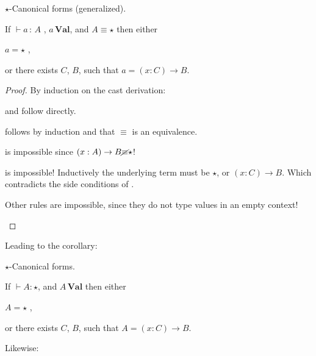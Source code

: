 \begin{lem} $\star$-Canonical forms (generalized).
 
If $\vdash a\,:\,A$ , $a\,\textbf{Val}$, and $A\equiv\star$ then either

\textup{$a=\star$ ,}

\textup{or there exists $C$, $B$, such that $a=\left(x:C\right)\rightarrow B$.}
\end{lem}
\begin{proof}
By induction on the cast derivation:
\begin{casenv}
 \item {} and  follow directly.
 \item {} follows by induction and that $\equiv$ is an equivalence.
 \item {} is impossible since $\left(x:A\right)\rightarrow B\cancel{\equiv}\star$!
 \item {} is impossible!
   Inductively the underlying term must be $\star$, or $\left(x:C\right)\rightarrow B$.
   Which contradicts the side conditions of .
 \item Other rules are impossible, since they do not type values in an empty context!
\end{casenv}
\end{proof}

Leading to the corollary:

\begin{cor} $\star$-Canonical forms.
 
If $\vdash A:\star$, and $A\,\textbf{Val}$ then either

\textup{$A=\star$ , }

\textup{or there exists $C$, $B$, such that $A=\left(x:C\right)\rightarrow B$.}
\end{cor}
 
Likewise:

